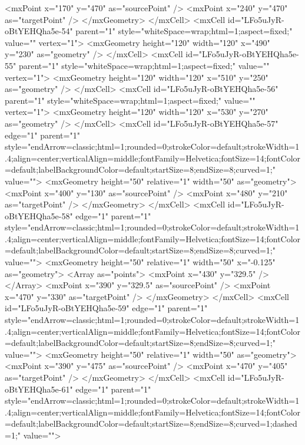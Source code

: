             <mxPoint x="170" y="470" as="sourcePoint" />
            <mxPoint x="240" y="470" as="targetPoint" />
          </mxGeometry>
        </mxCell>
        <mxCell id="LFo5uJyR-oBtYEHQha5e-54" parent="1" style="whiteSpace=wrap;html=1;aspect=fixed;" value="" vertex="1">
          <mxGeometry height="120" width="120" x="490" y="230" as="geometry" />
        </mxCell>
        <mxCell id="LFo5uJyR-oBtYEHQha5e-55" parent="1" style="whiteSpace=wrap;html=1;aspect=fixed;" value="" vertex="1">
          <mxGeometry height="120" width="120" x="510" y="250" as="geometry" />
        </mxCell>
        <mxCell id="LFo5uJyR-oBtYEHQha5e-56" parent="1" style="whiteSpace=wrap;html=1;aspect=fixed;" value="" vertex="1">
          <mxGeometry height="120" width="120" x="530" y="270" as="geometry" />
        </mxCell>
        <mxCell id="LFo5uJyR-oBtYEHQha5e-57" edge="1" parent="1" style="endArrow=classic;html=1;rounded=0;strokeColor=default;strokeWidth=1.4;align=center;verticalAlign=middle;fontFamily=Helvetica;fontSize=14;fontColor=default;labelBackgroundColor=default;startSize=8;endSize=8;curved=1;" value="">
          <mxGeometry height="50" relative="1" width="50" as="geometry">
            <mxPoint x="400" y="130" as="sourcePoint" />
            <mxPoint x="480" y="210" as="targetPoint" />
          </mxGeometry>
        </mxCell>
        <mxCell id="LFo5uJyR-oBtYEHQha5e-58" edge="1" parent="1" style="endArrow=classic;html=1;rounded=0;strokeColor=default;strokeWidth=1.4;align=center;verticalAlign=middle;fontFamily=Helvetica;fontSize=14;fontColor=default;labelBackgroundColor=default;startSize=8;endSize=8;curved=1;" value="">
          <mxGeometry height="50" relative="1" width="50" x="-0.125" as="geometry">
            <Array as="points">
              <mxPoint x="430" y="329.5" />
            </Array>
            <mxPoint x="390" y="329.5" as="sourcePoint" />
            <mxPoint x="470" y="330" as="targetPoint" />
          </mxGeometry>
        </mxCell>
        <mxCell id="LFo5uJyR-oBtYEHQha5e-59" edge="1" parent="1" style="endArrow=classic;html=1;rounded=0;strokeColor=default;strokeWidth=1.4;align=center;verticalAlign=middle;fontFamily=Helvetica;fontSize=14;fontColor=default;labelBackgroundColor=default;startSize=8;endSize=8;curved=1;" value="">
          <mxGeometry height="50" relative="1" width="50" as="geometry">
            <mxPoint x="390" y="475" as="sourcePoint" />
            <mxPoint x="470" y="405" as="targetPoint" />
          </mxGeometry>
        </mxCell>
        <mxCell id="LFo5uJyR-oBtYEHQha5e-61" edge="1" parent="1" style="endArrow=classic;html=1;rounded=0;strokeColor=default;strokeWidth=1.4;align=center;verticalAlign=middle;fontFamily=Helvetica;fontSize=14;fontColor=default;labelBackgroundColor=default;startSize=8;endSize=8;curved=1;dashed=1;" value="">
